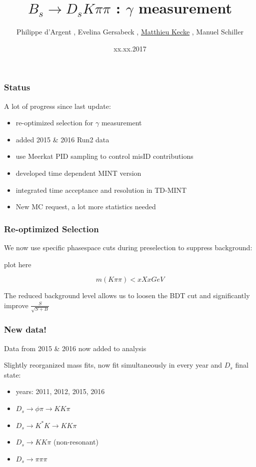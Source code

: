 \documentclass[]{beamer}
\title{$B_{s}\to D_{s}K\pi\pi$ : $\gamma$ measurement}
\author{Philippe d'Argent \inst{1}, Evelina Gersabeck \inst{1}, \underline{Matthieu Kecke} \inst{1}, Manuel Schiller \inst{2}}
\institute{\inst{1} PI Heidelberg, \inst{2} Glasgow}
\date{xx.xx.2017}
\begin{document}
\frame{\titlepage}


\begin{frame}
\frametitle{Status}

A lot of progress since last update:

\begin{itemize}

\item re-optimized selection for $\gamma$ measurement

\item added 2015 \& 2016 Run2 data 

\item use Meerkat PID sampling to control misID contributions

\item developed time dependent MINT version 

\item integrated time acceptance and resolution in TD-MINT

\item New MC request, a lot more statistics needed 

\end{itemize}


\end{frame}


\begin{frame}
\frametitle{Re-optimized Selection}

We now use specific phasespace cuts during preselection to suppress background:  

plot here

\[m(K\pi\pi) < xXx GeV\]

The reduced background level allows us to loosen the BDT cut and significantly improve $\frac{S}{\sqrt{S+B}}$ 


\end{frame}

\begin{frame}
\frametitle{New data!}

Data from 2015 \& 2016 now added to analysis \newline

Slightly reorganized mass fits, now fit simultaneously in every year and $D_{s}$ final state:

\begin{itemize} 

\item years: 2011, 2012, 2015, 2016

\item $D_{s}\to \phi\pi \to KK\pi$

\item $D_{s}\to K^{*}K \to KK\pi$

\item $D_{s} \to KK\pi$ (non-resonant)

\item $D_{s} \to \pi\pi\pi$

\end{itemize}

\end{frame}
\end{document}
